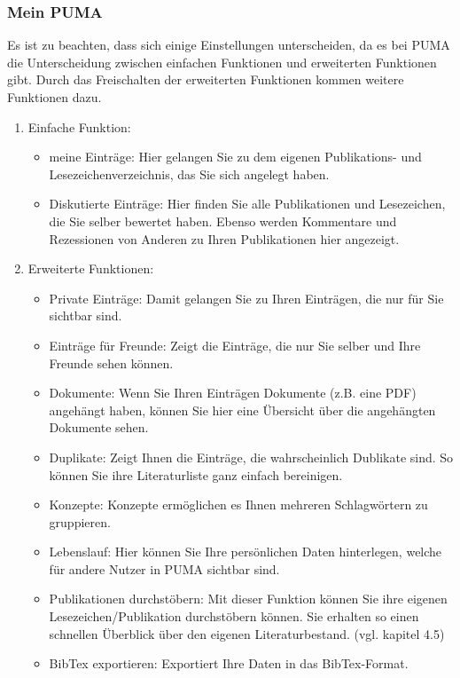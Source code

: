 \documentclass[a4paper,11pt,twoside]{scrbook}
\begin{document}
\subsubsection{Mein PUMA}
Es ist zu beachten, dass sich einige Einstellungen unterscheiden, da es bei PUMA die Unterscheidung zwischen einfachen Funktionen und erweiterten Funktionen gibt. Durch das Freischalten der erweiterten Funktionen kommen weitere Funktionen dazu.
\begin{enumerate}
    \item Einfache Funktion:
    \begin{itemize}
        \item meine Einträge: Hier gelangen Sie zu dem eigenen Publikations- und Lesezeichenverzeichnis, das Sie sich angelegt haben.
        \item Diskutierte Einträge: Hier finden Sie alle Publikationen und Lesezeichen, die Sie selber bewertet haben. Ebenso werden Kommentare und Rezessionen von Anderen zu Ihren Publikationen hier angezeigt.
    \end{itemize}
    \item Erweiterte Funktionen:
    \begin{itemize}
        \item Private Einträge: Damit gelangen Sie zu Ihren Einträgen, die nur für Sie sichtbar sind. 
        \item Einträge für Freunde: Zeigt die Einträge, die nur Sie selber und Ihre Freunde sehen können.
        \item Dokumente: Wenn Sie Ihren Einträgen Dokumente (z.B. eine PDF) angehängt haben, können Sie hier eine Übersicht über die angehängten Dokumente sehen.
        \item Duplikate: Zeigt Ihnen die Einträge, die wahrscheinlich Dublikate sind. So können Sie ihre Literaturliste ganz einfach bereinigen. 
        \item Konzepte: Konzepte ermöglichen es Ihnen mehreren Schlagwörtern zu gruppieren. %
        \item Lebenslauf: Hier können Sie Ihre persönlichen Daten hinterlegen, welche für andere Nutzer in PUMA sichtbar sind.
        \item Publikationen durchstöbern: Mit dieser Funktion können Sie ihre eigenen Lesezeichen/Publikation durchstöbern können. Sie erhalten so einen schnellen Überblick über den eigenen Literaturbestand. (vgl. kapitel 4.5)
        \item BibTex exportieren: Exportiert Ihre Daten in das BibTex-Format.
    \end{itemize}
\end{enumerate}
\end{document}
